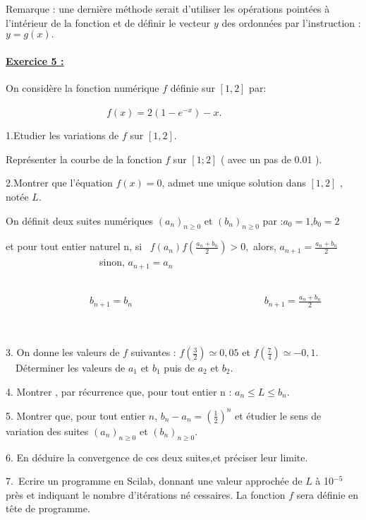 \documentclass{article}
\begin{document}
Remarque : une derni\`{e}re m\'{e}thode serait d'utiliser les op\'{e}rations
point\'{e}es \`{a} l'int\'{e}rieur de la fonction et de d\'{e}finir le
vecteur $y$ des ordonn\'{e}es par l'instruction : $y=g(x).$

\paragraph{\protect\underline{Exercice 5 :}}

On consid\`{e}re la fonction num\'{e}rique $f$ d\'{e}finie sur $\left[ 1,2%
\right] $ par:

\ \ \ \ \ \ \ \ \ \ \ \ \ \ \ \ \ \ \ \ $\ f(x)=2(1-e^{-x})-x.$

1.Etudier les variations de $f$ sur $\left[ 1,2\right] .$

Repr\'{e}senter la courbe de la fonction $f$ sur $\left[ 1;2\right] $ ( avec
un pas de 0.01 ).

2.Montrer que l'\'{e}quation $f(x)=0$, admet une unique solution dans $\left[
1,2\right] $ , not\'{e}e $L$.

On d\'{e}finit deux suites num\'{e}riques $(a_{n})_{n\geq 0}$ et $%
(b_{n})_{n\geq 0}$ par :$a_{0}=1$,$b_{0}=2$

et pour tout entier naturel n, si \ $f(a_{n})f(\frac{a_{n}+b_{n}}{2})>0,$
alors, $a_{n+1}=\frac{a_{n}+b_{n}}{2}$ \ \ \ \ \ \ \ \ \ \ \ \ \ \ \ \ \ \ \
sinon, $a_{n+1}=a_{n}$

\ \ \ \ \ \ \ \ \ \ \ \ \ \ \ \ \ \ \ \ \ \ \ \ \ \ \ \ \ \ \ \ \ \ \ \ \ \
\ \ \ \ \ \ \ \ \ \ \ \ \ \ \ \ \ \ \ \ \ \ \ \ \ \ \ \ \ \ \ \ \ \ \ \ \ \
\ \ \ \ \ \ \ \ \ \ \ \ \ $b_{n+1}=b_{n}$ \ \ \ \ \ \ \ \ \ \ \ \ \ \ \ \ \
\ \ \ \ \ \ \ \ \ $b_{n+1}=\frac{a_{n}+b_{n}}{2}$\ \ \ \ \ \ \ \ \ \ \ \ \ \
\ \ \ \ \ \ \ \ \ \ \ \ \ \ \ \ \ \ \ \ \ \ \ \ \ \ \ \ \ \ \ \ \ \ \ \ \ \
\ \ \ \ \ \ \ \ \ \ \ \ \ \ \ \ \ \ \ \ \ \ \ \ \ \ \ \ \ \ \ \ \ \ \ \ \ \
\ \ \ \ \ \ \ \ \ \ \ \ 

3. On donne les valeurs de $f$ suivantes : $f(\frac{3}{2})\simeq 0,05$ et $f(%
\frac{7}{4})\simeq -0,1.$ \ \ D\'{e}terminer les valeurs de $a_{1}$ et $%
b_{1} $ puis de $a_{2}$ et $b_{2}.$

4. Montrer , par r\'{e}currence que, pour tout entier n : $a_{n}\leq L\leq
b_{n}.$

5. Montrer que, pour tout entier $n$, $b_{n}-a_{n}=(\frac{1}{2})^{n}$ et 
\'{e}tudier le sens de variation des suites $(a_{n})_{n\geq 0}$ et $%
(b_{n})_{n\geq 0}$.

6. En d\'{e}duire la convergence de ces deux suites,et pr\'{e}ciser leur
limite.

7.\ Ecrire un programme en Scilab, donnant une valeur approch\'{e}e de $L$ 
\`{a} 10$^{-5}$ pr\`{e}s et indiquant le nombre d'it\'{e}rations n\'{e}%
cessaires. La fonction $f$ sera d\'{e}finie en t\^{e}te de programme.
\end{document}
